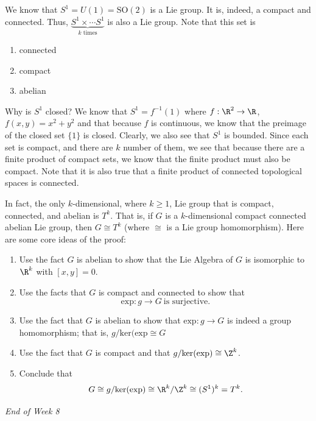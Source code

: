 \begin{eg}
    We know that \( S^{1} = U(1) = \text{SO}(2) \) is a Lie group. It is, indeed, a compact and connected. Thus, \( \underbrace{S^{1} \times \cdots S^{1}}_{k \text{ times}}  \) is also a Lie group. Note that this set is 
    \begin{enumerate}
        \item[(1)] connected
        \item[(2)] compact
        \item[(3)] abelian
    \end{enumerate}
    Why is \( S^{1} \) closed? We know that \( S^{1} = f^{-1}(1) \) where \( f :\R^{2} \to \R  \), \( f(x,y) = x^{2} + y^{2} \) and that because \( f  \) is continuous, we know that the preimage of the closed set \( \{ 1  \}  \) is closed. Clearly, we also see that \( S^{1} \) is bounded. Since each set is compact, and there are \( k  \) number of them, we see that because there are a finite product of compact sets, we know that the finite product must also be compact. Note that it is also true that a finite product of connected topological spaces is connected.

\end{eg}
In fact, the only \( k \)-dimensional, where \( k \geq 1  \), Lie group that is compact, connected, and abelian is \( T^{k} \). That is, if \( G  \) is a \( k  \)-dimensional compact connected abelian Lie group, then \( G \cong T^{k} \) (where \( \cong  \) is a Lie group homomorphism). Here are some core ideas of the proof:
    \begin{enumerate}
        \item[(1)] Use the fact \( G  \) is abelian to show that the Lie Algebra of \( G  \) is isomorphic to \( \R^{k} \) with \( [x,y] = 0  \).
        \item[(2)] Use the facts that \( G  \) is compact and connected to show that 
            \[  \text{exp}: g \to G \ \text{is surjective}. \]
        \item[(3)] Use the fact that \( G  \) is abelian to show that \( \text{exp}:g \to G   \) is indeed a group homomorphism; that is, \( g / \text{ker}(\text{exp} \cong G  \)
        \item[(4)] Use the fact that \( G  \) is compact and that \( g / \text{ker}(\text{exp}) \cong \Z^{k} \).
        \item[(5)] Conclude that 
            \[ G \cong g / \text{ker}(\text{exp}) \cong \R^{k} / \Z^{k} \cong (S^{1})^{k}  = T^{k}.  \]
    \end{enumerate}

\begin{center}
   \textit{End of Week 8}  
\end{center}
